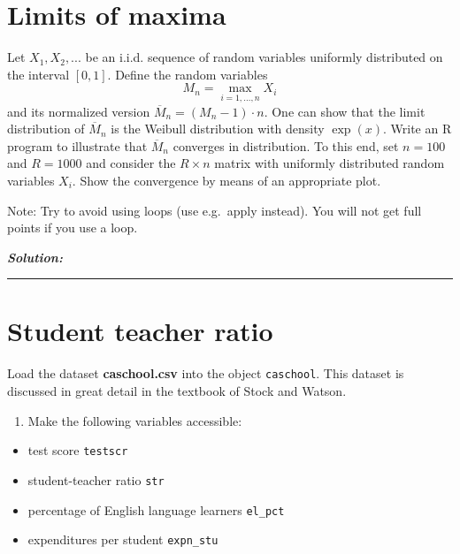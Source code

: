 \documentclass[]{article}
\providecommand{\tightlist}{%
  \setlength{\itemsep}{0pt}\setlength{\parskip}{0pt}}
\begin{document}
\section{Limits of maxima}\label{limits-of-maxima}

Let \(X_{1}, X_{2},...\) be an i.i.d. sequence of random variables
uniformly distributed on the interval \([0,1]\). Define the random
variables \[
M_{n}=\max_{i=1,\ldots ,n}X_{i}
\] and its normalized version \(\overline{M}_{n}=(M_{n}-1)\cdot n\). One
can show that the limit distribution of \(\overline{M}_{n}\) is the
Weibull distribution with density \(\exp \left( x\right)\). Write an R
program to illustrate that \(\overline{M}_{n}\) converges in
distribution. To this end, set \(n=100\) and \(R=1000\) and consider the
\(R \times n\) matrix with uniformly distributed random variables
\(X_i\). Show the convergence by means of an appropriate plot.

Note: Try to avoid using loops (use e.g.~apply instead). You will not
get full points if you use a loop.

\textbf{\emph{Solution:}}

\pagebreak

\begin{center}\rule{0.5\linewidth}{\linethickness}\end{center}

\section{Student teacher ratio}\label{student-teacher-ratio}

Load the dataset \textbf{caschool.csv} into the object
\texttt{caschool}. This dataset is discussed in great detail in the
textbook of Stock and Watson.

\begin{enumerate}
\def\labelenumi{\arabic{enumi}.}
\tightlist
\item
  Make the following variables accessible:
\end{enumerate}

\begin{itemize}
\item
  test score \texttt{testscr}
\item
  student-teacher ratio \texttt{str}
\item
  percentage of English language learners \texttt{el\_pct}
\item
  expenditures per student \texttt{expn\_stu}
\end{itemize}
\end{document}
